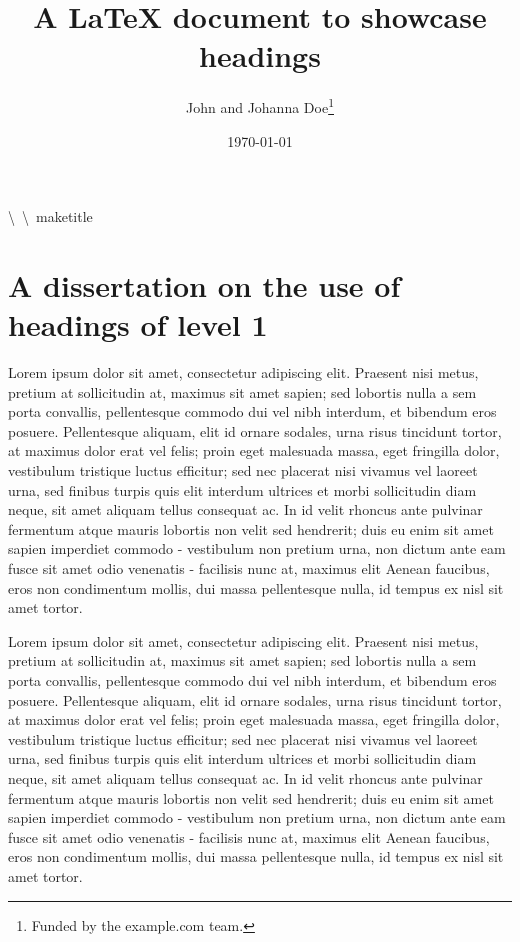 \documentclass[10pt,a4paper]{book}
\title{A \LaTeX{} document to showcase headings}
\author{John and Johanna Doe\thanks{Funded by the example.com team.}}
\date{\today} %
\begin{document}
\maketitle

\textbackslash~\textbackslash~maketitle
\section{A dissertation on the use of headings of level 1}

Lorem ipsum dolor sit amet, consectetur adipiscing elit. Praesent nisi metus, pretium at sollicitudin at, maximus sit amet sapien; sed lobortis nulla a sem porta convallis, pellentesque commodo dui vel nibh interdum, et bibendum eros posuere. Pellentesque aliquam, elit id ornare sodales, urna risus tincidunt tortor, at maximus dolor erat vel felis; proin eget malesuada massa, eget fringilla dolor, vestibulum tristique luctus efficitur; sed nec placerat nisi vivamus vel laoreet urna, sed finibus turpis quis elit interdum ultrices et morbi sollicitudin diam neque, sit amet aliquam tellus consequat ac. In id velit rhoncus ante pulvinar fermentum atque mauris lobortis non velit sed hendrerit; duis eu enim sit amet sapien imperdiet commodo - vestibulum non pretium urna, non dictum ante eam fusce sit amet odio venenatis - facilisis nunc at, maximus elit Aenean faucibus, eros non condimentum mollis, dui massa pellentesque nulla, id tempus ex nisl sit amet tortor.

Lorem ipsum dolor sit amet, consectetur adipiscing elit. Praesent nisi metus, pretium at sollicitudin at, maximus sit amet sapien; sed lobortis nulla a sem porta convallis, pellentesque commodo dui vel nibh interdum, et bibendum eros posuere. Pellentesque aliquam, elit id ornare sodales, urna risus tincidunt tortor, at maximus dolor erat vel felis; proin eget malesuada massa, eget fringilla dolor, vestibulum tristique luctus efficitur; sed nec placerat nisi vivamus vel laoreet urna, sed finibus turpis quis elit interdum ultrices et morbi sollicitudin diam neque, sit amet aliquam tellus consequat ac. In id velit rhoncus ante pulvinar fermentum atque mauris lobortis non velit sed hendrerit; duis eu enim sit amet sapien imperdiet commodo - vestibulum non pretium urna, non dictum ante eam fusce sit amet odio venenatis - facilisis nunc at, maximus elit Aenean faucibus, eros non condimentum mollis, dui massa pellentesque nulla, id tempus ex nisl sit amet tortor.
\end{document}
